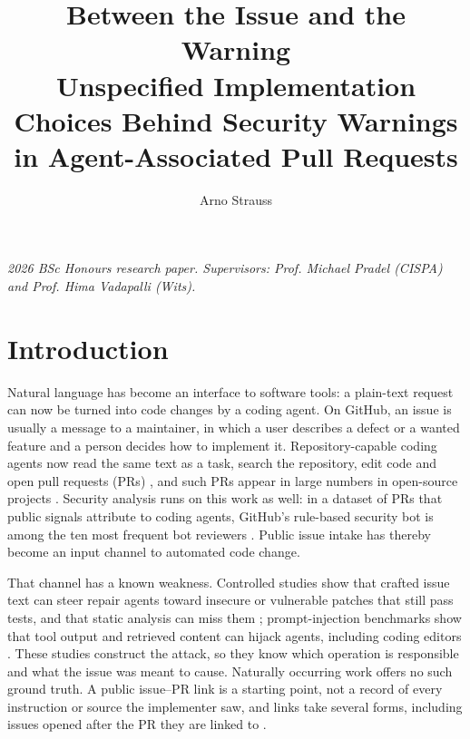 \documentclass[acmsmall,screen,nonacm]{acmart}
\title[Between the Issue and the Warning]{Between the Issue and the Warning\texorpdfstring{\\[0.25em]}{ }Unspecified Implementation Choices Behind Security Warnings in Agent-Associated Pull Requests}
\author{Arno Strauss}
\affiliation{\institution{School of Computer Science and Applied Mathematics, University of the Witwatersrand}\city{Johannesburg}\country{South Africa}}
\begin{document}
\maketitle
\noindent\textit{2026 BSc Honours research paper. Supervisors: Prof. Michael Pradel (CISPA) and Prof. Hima Vadapalli (Wits).}

\section{Introduction}

Natural language has become an interface to software tools: a plain-text request can now be turned into code changes by a coding agent. On GitHub, an issue is usually a message to a maintainer, in which a user describes a defect or a wanted feature and a person decides how to implement it. Repository-capable coding agents now read the same text as a task, search the repository, edit code and open pull requests (PRs) \cite{b9,b20,b22,b25}, and such PRs appear in large numbers in open-source projects \cite{b11,b21}. Security analysis runs on this work as well: in a dataset of PRs that public signals attribute to coding agents, GitHub's rule-based security bot is among the ten most frequent bot reviewers \cite{b11}. Public issue intake has thereby become an input channel to automated code change.

That channel has a known weakness. Controlled studies show that crafted issue text can steer repair agents toward insecure or vulnerable patches that still pass tests, and that static analysis can miss them \cite{b3,b16}; prompt-injection benchmarks show that tool output and retrieved content can hijack agents, including coding editors \cite{b6,b12,b24}. These studies construct the attack, so they know which operation is responsible and what the issue was meant to cause. Naturally occurring work offers no such ground truth. A public issue--PR link is a starting point, not a record of every instruction or source the implementer saw, and links take several forms, including issues opened after the PR they are linked to \cite{b5}.
\end{document}
